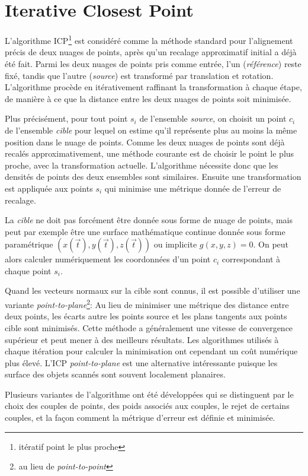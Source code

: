 \documentclass[a4paper,10pt]{scrreprt}
\begin{document}
\section{Iterative Closest Point}
L'algorithme ICP\footnote{itératif point le plus proche} est considéré comme la méthode standard pour l'alignement précis de deux nuages de points, après qu'un recalage approximatif initial a déjà été fait. Parmi les deux nuages de points pris comme entrée, l'un (\emph{référence}) reste fixé, tandis que l'autre (\emph{source}) est transformé par translation et rotation. L'algorithme procède en itérativement raffinant la transformation à chaque étape, de manière à ce que la distance entre les deux nuages de points soit minimisée.

Plus précisément, pour tout point $s_i$ de l'ensemble \emph{source}, on choisit un point $c_i$ de l'ensemble \emph{cible} pour lequel on estime qu'il représente plus au moins la même position dans le nuage de points. Comme les deux nuages de points sont déjà recalés approximativement, une méthode courante est de choisir le point le plus proche, avec la transformation actuelle. L'algorithme nécessite donc que les densités de points des deux ensembles sont similaires. Ensuite une transformation est appliquée aux points $s_i$ qui minimise une métrique donnée de l'erreur de recalage.

La \emph{cible} ne doit pas forcément être donnée sous forme de nuage de points, mais peut par exemple être une surface mathématique continue donnée sous forme paramétrique $(x(\vec{t}),y(\vec{t}),z(\vec{t}))$ ou implicite $g(x, y, z) = 0$. On peut alors calculer numériquement les coordonnées d'un point $c_i$ correspondant à chaque point $s_i$. \cite{Besl1992}

Quand les vecteurs normaux sur la cible sont connus, il est possible d'utiliser une variante \emph{point-to-plane}\footnote{au lieu de \emph{point-to-point}}: Au lieu de minimiser une métrique des distance entre deux points, les écarts autre les points source et les plans tangents aux points cible sont minimisés. Cette méthode a généralement une vitesse de convergence supérieur et peut mener à des meilleurs résultats. Les algorithmes utilisés à chaque itération pour calculer la minimisation ont cependant un coût numérique plus élevé. L'ICP \emph{point-to-plane} est une alternative intéressante puisque les surface des objets scannés sont souvent localement planaires. \cite{Low2004}

Plusieurs variantes de l'algorithme ont été développées qui se distinguent par le choix des couples de points, des poids associés aux couples, le rejet de certains couples, et la façon comment la métrique d'erreur est définie et minimisée. \cite{Rusi2001}
\end{document}
